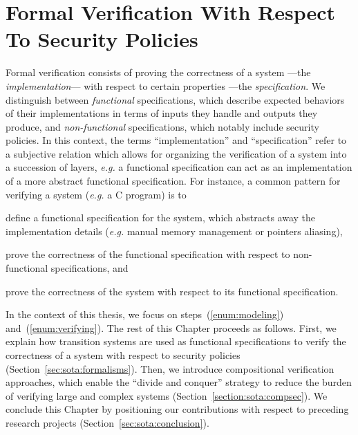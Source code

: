 \chapter{Formal Verification With Respect To Security Policies}
\label{chapter:relatedwork}



\vspace{1cm}\noindent
%
Formal verification consists of proving the correctness of a system ---the
\emph{implementation}--- with respect to certain properties ---the
\emph{specification}.
%
We distinguish between \emph{functional} specifications, which describe expected
behaviors of their implementations in terms of inputs they handle and outputs
they produce, and \emph{non-functional} specifications, which notably include
security policies.
%
In this context, the terms ``implementation'' and ``specification'' refer to a
subjective relation which allows for organizing the verification of a system
into a succession of layers, \emph{e.g.} a functional specification can act as
an implementation of a more abstract functional specification.
%
For instance, a common pattern for verifying a system (\emph{e.g.} a C program)
is to
%
\begin{inparaenum}[(1)]
\item \label{enum:modeling}
  define a functional specification for the system, which abstracts away the
  implementation details (\emph{e.g.} manual memory management or pointers
  aliasing),
\item \label{enum:verifying}
  prove the correctness of the functional specification with respect to
  non-functional specifications, and
\item \label{enum:equivalence}
  prove the correctness of the system with respect to its functional
  specification.
\end{inparaenum}

In the context of this thesis, we focus on steps~(\ref{enum:modeling})
and~(\ref{enum:verifying}).
%
The rest of this Chapter proceeds as follows.
%
First, we explain how transition systems are used as functional specifications
to verify the correctness of a system with respect to security policies
(Section~\ref{sec:sota:formalisms}).
%
Then, we introduce compositional verification approaches, which enable the
``divide and conquer'' strategy to reduce the burden of verifying large and
complex systems (Section~\ref{section:sota:compsec}).
%
We conclude this Chapter by positioning our contributions with respect to
preceding research projects (Section~\ref{sec:sota:conclusion}).

